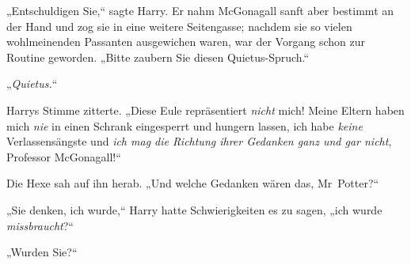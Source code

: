 „Entschuldigen Sie,“ sagte Harry. Er nahm McGonagall sanft aber bestimmt an der Hand und zog sie in eine weitere Seitengasse; nachdem sie so vielen wohlmeinenden Passanten ausgewichen waren, war der Vorgang schon zur Routine geworden. „Bitte zaubern Sie diesen Quietus-Spruch.“

„\emph{Quietus.}“

Harrys Stimme zitterte. „Diese Eule repräsentiert \emph{nicht} mich! Meine Eltern haben mich \emph{nie} in einen Schrank eingesperrt und hungern lassen, ich habe \emph{keine} Verlassensängste und \emph{ich mag die Richtung ihrer Gedanken ganz und gar nicht}, Professor McGonagall!“

Die Hexe sah auf ihn herab. „Und welche Gedanken wären das, Mr~Potter?“

„Sie denken, ich wurde,“ Harry hatte Schwierigkeiten es zu sagen, „ich wurde \emph{missbraucht}?“

„Wurden Sie?“


